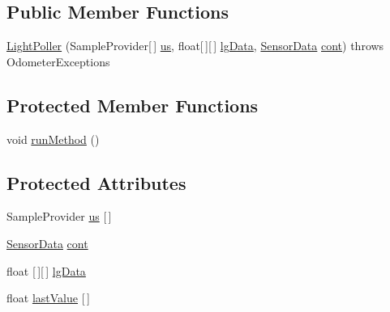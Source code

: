 \subsection*{Public Member Functions}
\begin{DoxyCompactItemize}
\item 
\hyperlink{classca_1_1mcgill_1_1ecse211_1_1threads_1_1_light_poller_adc07f842a1cc089195c5e47c2a0e5ee6}{Light\+Poller} (Sample\+Provider\mbox{[}$\,$\mbox{]} \hyperlink{classca_1_1mcgill_1_1ecse211_1_1threads_1_1_light_poller_ab6a9cb770bbf71f586697633db1475ff}{us}, float\mbox{[}$\,$\mbox{]}\mbox{[}$\,$\mbox{]} \hyperlink{classca_1_1mcgill_1_1ecse211_1_1threads_1_1_light_poller_a6cf53aecc3efc481f71d36341d2276c6}{lg\+Data}, \hyperlink{classca_1_1mcgill_1_1ecse211_1_1threads_1_1_sensor_data}{Sensor\+Data} \hyperlink{classca_1_1mcgill_1_1ecse211_1_1threads_1_1_light_poller_ab6a9050ced4f6940add4735c8872194a}{cont})  throws Odometer\+Exceptions 
\end{DoxyCompactItemize}
\subsection*{Protected Member Functions}
\begin{DoxyCompactItemize}
\item 
void \hyperlink{classca_1_1mcgill_1_1ecse211_1_1threads_1_1_light_poller_aab90a460a4d0c926fb8f3930492a8fb1}{run\+Method} ()
\end{DoxyCompactItemize}
\subsection*{Protected Attributes}
\begin{DoxyCompactItemize}
\item 
Sample\+Provider \hyperlink{classca_1_1mcgill_1_1ecse211_1_1threads_1_1_light_poller_ab6a9cb770bbf71f586697633db1475ff}{us} \mbox{[}$\,$\mbox{]}
\item 
\hyperlink{classca_1_1mcgill_1_1ecse211_1_1threads_1_1_sensor_data}{Sensor\+Data} \hyperlink{classca_1_1mcgill_1_1ecse211_1_1threads_1_1_light_poller_ab6a9050ced4f6940add4735c8872194a}{cont}
\item 
float \mbox{[}$\,$\mbox{]}\mbox{[}$\,$\mbox{]} \hyperlink{classca_1_1mcgill_1_1ecse211_1_1threads_1_1_light_poller_a6cf53aecc3efc481f71d36341d2276c6}{lg\+Data}
\item 
float \hyperlink{classca_1_1mcgill_1_1ecse211_1_1threads_1_1_light_poller_a79908bf56395ae82ab5ac57b5b40f206}{last\+Value} \mbox{[}$\,$\mbox{]}
\end{DoxyCompactItemize}
